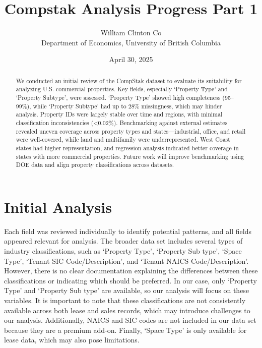 \documentclass[
  12pt]{article}
\begin{document}
\def\spacingset#1{\renewcommand{\baselinestretch}%
{#1}\small\normalsize} \spacingset{1}



\date{April 30, 2025}
\title{\bf Compstak Analysis Progress Part 1}
\author{
William Clinton Co\\
Department of Economics, University of British Columbia\\
}
\maketitle

\bigskip
\bigskip
\begin{abstract}
We conducted an initial review of the CompStak dataset to evaluate its
suitability for analyzing U.S. commercial properties. Key fields,
especially `Property Type' and `Property Subtype', were assessed.
`Property Type' showed high completeness (95--99\%), while `Property
Subtype' had up to 28\% missingness, which may hinder analysis. Property
IDs were largely stable over time and regions, with minimal
classification inconsistencies (\textless0.02\%). Benchmarking against
external estimates revealed uneven coverage across property types and
states---industrial, office, and retail were well-covered, while land
and multifamily were underrepresented. West Coast states had higher
representation, and regression analysis indicated better coverage in
states with more commercial properties. Future work will improve
benchmarking using DOE data and align property classifications across
datasets.
\end{abstract}


\newpage
\spacingset{1.9} %

\section{Initial Analysis}\label{sec-intro}

Each field was reviewed individually to identify potential patterns, and
all fields appeared relevant for analysis. The broader data set includes
several types of industry classifications, such as `Property Type',
`Property Sub type', `Space Type', `Tenant SIC Code/Description', and
`Tenant NAICS Code/Description'. However, there is no clear
documentation explaining the differences between these classifications
or indicating which should be preferred. In our case, only `Property
Type' and `Property Sub type' are available, so our analysis will focus
on these variables. It is important to note that these classifications
are not consistently available across both lease and sales records,
which may introduce challenges to our analysis. Additionally, NAICS and
SIC codes are not included in our data set because they are a premium
add-on. Finally, `Space Type' is only available for lease data, which
may also pose limitations.
\end{document}
